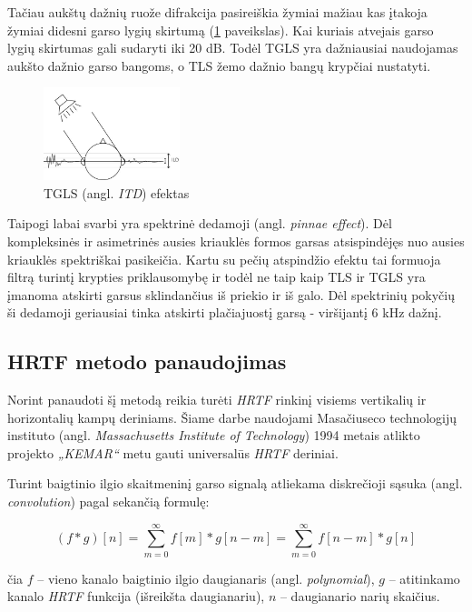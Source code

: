 \documentclass[]{vgtuef}
\begin{document}
Tačiau aukštų dažnių ruože difrakcija pasireiškia žymiai mažiau kas įtakoja žymiai didesni garso lygių skirtumą (\ref{fig:ILD_1} paveikslas). Kai kuriais atvejais garso lygių skirtumas gali sudaryti iki 20 dB. Todėl TGLS yra dažniausiai naudojamas aukšto dažnio garso bangoms, o TLS žemo dažnio bangų krypčiai nustatyti. 

\begin{figure}[!h]
  \centering
  \includegraphics[width=150px]{img/ILD.jpg}
  \caption{TGLS (angl. \textit{ITD}) efektas}
  \label{fig:ILD_1}
\end{figure}

Taipogi labai svarbi yra spektrinė dedamoji (angl. \textit{pinnae effect}). Dėl kompleksinės ir asimetrinės ausies kriauklės formos garsas atsispindėjęs nuo ausies kriauklės spektriškai pasikeičia.  Kartu su pečių atspindžio efektu tai formuoja filtrą turintį krypties priklausomybę ir todėl ne taip kaip TLS ir TGLS yra įmanoma atskirti garsus sklindančius iš priekio ir iš galo. Dėl spektrinių pokyčių ši dedamoji geriausiai tinka atskirti plačiajuostį garsą - viršijantį 6 kHz dažnį.


\subsection{HRTF metodo panaudojimas}

Norint panaudoti šį metodą reikia turėti \textit{HRTF} rinkinį visiems vertikalių ir horizontalių kampų deriniams. Šiame darbe naudojami Masačiuseco technologijų instituto (angl. \textit{Massachusetts Institute of Technology}) 1994 metais atlikto projekto \textit{„KEMAR“} metu gauti universalūs \textit{HRTF} deriniai.

Turint baigtinio ilgio skaitmeninį garso signalą atliekama diskrečioji sąsuka (angl. \textit{convolution}) pagal sekančią formulę:

\begin{equation}
(f * g)[n] = \sum_{m=0}^{\infty} f[m]*g[n-m]=\sum_{m=0}^{\infty} f[n-m]*g[n]
\end{equation}

čia $f$ – vieno kanalo baigtinio ilgio daugianaris (angl. \textit{polynomial}), $g$ – atitinkamo kanalo \textit{HRTF} funkcija (išreikšta daugianariu), $n$ – daugianario narių skaičius.
\end{document}
